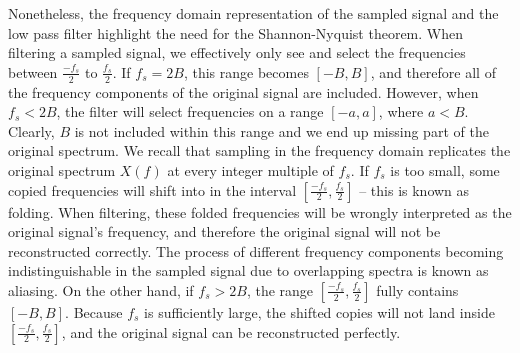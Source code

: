 \documentclass{article}
\begin{document}
Nonetheless, the frequency domain representation of the sampled signal and the low pass filter highlight the need for the Shannon-Nyquist theorem.
When filtering a sampled signal, we effectively only see and select the frequencies between $\frac{-f_s}{2}$ to $\frac{f_s}{2}$.
If $f_s = 2B$, this range becomes $[-B, B]$, and therefore all of the frequency components of the original signal are included.
However, when $f_s < 2B$, the filter will select frequencies on a range $[-a, a]$, where $a < B$. Clearly, $B$ is not included within this range and we end up missing part of the original spectrum.
We recall that sampling in the frequency domain replicates the original spectrum $X(f)$ at every integer multiple of $f_s$.
If $f_s$ is too small, some copied frequencies will shift into in the interval $\left[\frac{-f_s}{2}, \frac{f_s}{2}\right]$ -- this is known as folding.
When filtering, these folded frequencies will be wrongly interpreted as the original signal's frequency, and therefore the original signal will not be reconstructed correctly.
The process of different frequency components becoming indistinguishable in the sampled signal due to overlapping spectra is known as aliasing.
On the other hand, if $f_s > 2B$, the range $\left[\frac{-f_s}{2}, \frac{f_s}{2}\right]$ fully contains $\left[-B, B \right]$. 
Because $f_s$ is sufficiently large, the shifted copies will not land inside $\left[\frac{-f_s}{2}, \frac{f_s}{2}\right]$, and the original signal can be reconstructed perfectly.

\end{document}
